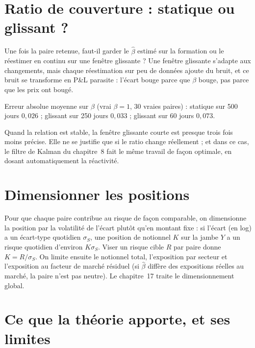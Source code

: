 \section{Ratio de couverture : statique ou glissant ?}

Une fois la paire retenue, faut-il garder le $\hat\beta$ estimé sur la formation ou le réestimer en continu sur une fenêtre glissante ? Une fenêtre glissante s'adapte aux changements, mais chaque réestimation sur peu de données ajoute du bruit, et ce bruit se transforme en P\&L parasite : l'écart \og bouge\fg{} parce que $\beta$ bouge, pas parce que les prix ont bougé.

\begin{codebox}
Erreur absolue moyenne sur $\beta$ (vrai $\beta = 1$, 30 vraies paires) : statique sur 500 jours $0{,}026$ ; glissant sur 250 jours $0{,}033$ ; glissant sur 60 jours $0{,}073$.
\end{codebox}

Quand la relation est stable, la fenêtre glissante courte est presque trois fois moins précise. Elle ne se justifie que si le ratio change réellement ; et dans ce cas, le filtre de Kalman du chapitre~8 fait le même travail de façon optimale, en dosant automatiquement la réactivité.

\section{Dimensionner les positions}

Pour que chaque paire contribue au risque de façon comparable, on dimensionne la position par la volatilité de l'écart plutôt qu'en montant fixe : si l'écart (en log) a un écart-type quotidien $\sigma_S$, une position de notionnel $K$ sur la jambe $Y$ a un risque quotidien d'environ $K\sigma_S$. Viser un risque cible $R$ par paire donne $K = R/\sigma_S$. On limite ensuite le notionnel total, l'exposition par secteur et l'exposition au facteur de marché résiduel (si $\hat\beta$ diffère des expositions réelles au marché, la paire n'est pas neutre). Le chapitre~17 traite le dimensionnement global.

\section{Ce que la théorie apporte, et ses limites}

